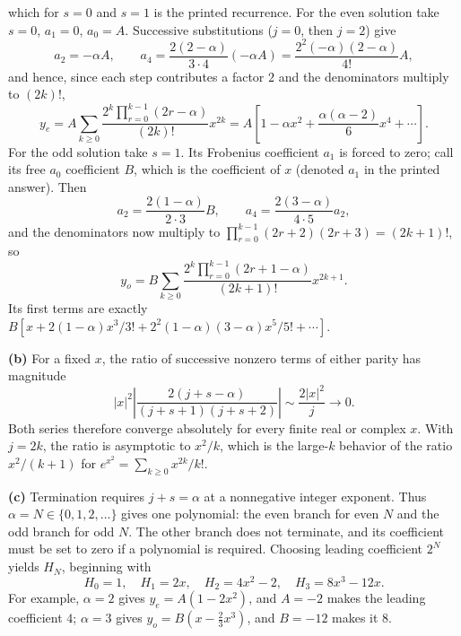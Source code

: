 which for $s=0$ and $s=1$ is the printed recurrence.
For the even solution take $s=0$, $a_1=0$, $a_0=A$.  Successive
substitutions ($j=0$, then $j=2$) give
\[
a_2=-\alpha A,\qquad
 a_4=\frac{2(2-\alpha)}{3\cdot4}(-\alpha A)
 =\frac{2^2(-\alpha)(2-\alpha)}{4!}A,
\]
and hence, since each step contributes a factor $2$ and the
denominators multiply to $(2k)!$,
\[
y_e=A\sum_{k\ge0}
\frac{2^k\prod_{r=0}^{k-1}(2r-\alpha)}{(2k)!}x^{2k}
=A\left[1-\alpha x^2+\frac{\alpha(\alpha-2)}6x^4+\cdots\right].
\]
For the odd solution take $s=1$.  Its Frobenius coefficient $a_1$
is forced to zero; call its free $a_0$ coefficient $B$, which is the
coefficient of $x$ (denoted $a_1$ in the printed answer).  Then
\[
a_2=\frac{2(1-\alpha)}{2\cdot3}B,\qquad
 a_4=\frac{2(3-\alpha)}{4\cdot5}a_2,
\]
and the denominators now multiply to
$\prod_{r=0}^{k-1}(2r+2)(2r+3)=(2k+1)!$, so
\[
y_o=B\sum_{k\ge0}
\frac{2^k\prod_{r=0}^{k-1}(2r+1-\alpha)}{(2k+1)!}x^{2k+1}.
\]
Its first terms are exactly $B[x+2(1-\alpha)x^3/3!
+2^2(1-\alpha)(3-\alpha)x^5/5!+\cdots]$.

\textbf{(b)} For a fixed $x$, the ratio of successive nonzero
terms of either parity has magnitude
\[
|x|^2\left|\frac{2(j+s-\alpha)}{(j+s+1)(j+s+2)}\right|
\sim\frac{2|x|^2}{j}\longrightarrow0.
\]
Both series therefore converge absolutely for every finite real or
complex $x$.  With $j=2k$, the ratio is asymptotic to $x^2/k$,
which is the large-$k$ behavior of the ratio $x^2/(k+1)$ for
$e^{x^2}=\sum_{k\ge0}x^{2k}/k!$.

\textbf{(c)} Termination requires $j+s=\alpha$ at a nonnegative
integer exponent.  Thus $\alpha=N\in\{0,1,2,\ldots\}$ gives one
polynomial: the even branch for even $N$ and the odd branch for odd
$N$.  The other branch does not terminate, and its coefficient must
be set to zero if a polynomial is required.  Choosing leading
coefficient $2^N$ yields $H_N$, beginning with
\[
H_0=1,\quad H_1=2x,\quad H_2=4x^2-2,\quad H_3=8x^3-12x.
\]
For example, $\alpha=2$ gives $y_e=A(1-2x^2)$, and $A=-2$ makes the
leading coefficient $4$; $\alpha=3$ gives
$y_o=B(x-\frac23x^3)$, and $B=-12$ makes it $8$.


